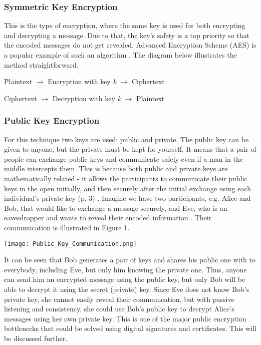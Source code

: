 \documentclass[a4paper, 12pt, titlepage]{article}
\begin{document}
\subsubsection{Symmetric Key Encryption}
This is the type of encryption, where the same key is used for both encrypting and decrypting a message. Due to that, the key's safety is a top priority so that the encoded messages do not get revealed. Advanced Encryption Scheme (AES) is a popular example of such an algorithm \cite{AESEncryption, PKCryptography}. The diagram below illustrates the method straightforward.

\begin{center}
\item Plaintext $\rightarrow$ Encryption with key \textit{k} $\rightarrow$ Ciphertext
\item Ciphertext $\rightarrow$ Decryption with key \textit{k} $\rightarrow$ Plaintext
\end{center}

\subsubsection{Public Key Encryption}
For this technique two keys are used: public and private. The public key can be given to anyone, but the private must be kept for yourself. It means that a pair of people can exchange public keys and communicate safely even if a man in the middle intercepts them. This is because both public and private keys are mathematically related - it allows the participants to communicate their public keys in the open initially, and then securely after the initial exchange using each individual's private key (p. 3) \cite{PKCryptography}. Imagine we have two participants, e.g. Alice and Bob, that would like to exchange a message securely, and Eve, who is an eavesdropper and wants to reveal their encoded information \cite{PKCryptography}. Their communication is illustrated in Figure 1.

\begin{center}
\texttt{[image: Public\_Key\_Communication.png]}
\label{fig:PKC}
\end{center}
It can be seen that Bob generates a pair of keys and shares his public one with to everybody, including Eve, but only him knowing the private one. Thus, anyone can send him an encrypted message using the public key, but only Bob will be able to decrypt it using the secret (private) key. Since Eve does not know Bob's private key, she cannot easily reveal their communication, but with passive listening and consistency, she could use Bob's public key to decrypt Alice's messages using her own private key. This is one of the major public encryption bottlenecks that could be solved using digital signatures and certificates. This will be discussed further.
\end{document}
